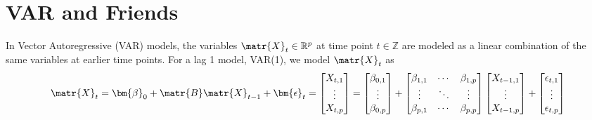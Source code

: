 \chapter{VAR and Friends}
\label{app:I}
In Vector Autoregressive (VAR) models, the variables $\matr{X}_t \in \mathbb{R}^p$ at time point $t \in \mathbb{Z}$ are modeled as a linear combination of the same variables at earlier time points. For a lag 1 model, VAR(1), we model $\matr{X}_t$ as
\begin{equation}
    \matr{X}_t = \bm{\beta}_0 + \matr{B}\matr{X}_{t-1} + \bm{\epsilon}_t =
    \begin{bmatrix}
    X_{t,1} \\
    \vdots \\
    X_{t,p}
    \end{bmatrix} =
    \begin{bmatrix}
    \beta_{0,1} \\
    \vdots \\
    \beta_{0,p}
    \end{bmatrix} +
    \begin{bmatrix}
    \beta_{1,1} & \cdots & \beta_{1,p} \\
    \vdots & \ddots & \vdots \\
    \beta_{p,1} & \cdots & \beta_{p,p}
    \end{bmatrix}
    \begin{bmatrix}
    X_{t-1,1} \\
    \vdots \\
    X_{t-1,p}
    \end{bmatrix} + 
    \begin{bmatrix}
    \epsilon_{t,1} \\
    \vdots \\
    \epsilon_{t,p}
    \end{bmatrix}
\end{equation}

